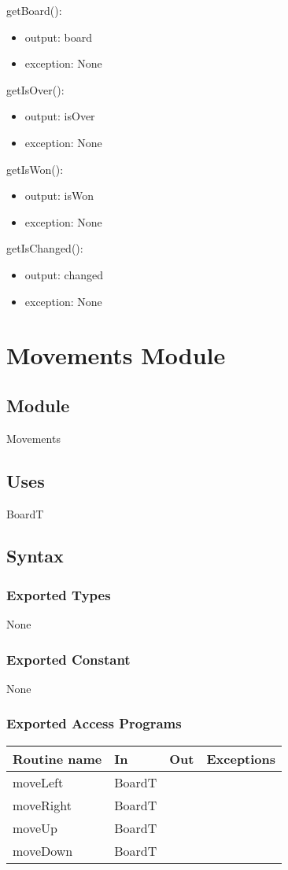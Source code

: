 \documentclass[12pt]{article}
\begin{document}
\noindent getBoard():
\begin{itemize}
    \item output: board
    \item exception: None
\end{itemize}

\noindent getIsOver():
\begin{itemize}
    \item output: isOver
    \item exception: None
\end{itemize}

\noindent getIsWon():
\begin{itemize}
    \item output: isWon
    \item exception: None
\end{itemize}

\noindent getIsChanged():
\begin{itemize}
    \item output: changed
    \item exception: None
\end{itemize}

\newpage

\section* {Movements Module}

\subsection*{Module}
Movements

\subsection* {Uses}
BoardT
\subsection* {Syntax}
\subsubsection* {Exported Types}
None
\subsubsection* {Exported Constant}
None
\subsubsection* {Exported Access Programs}
\begin{tabular}{| l | l | l | l |}
\hline
\textbf{Routine name} & \textbf{In} & \textbf{Out} & \textbf{Exceptions}\\
\hline
moveLeft & BoardT &  & \\
\hline
moveRight & BoardT &  & \\
\hline
moveUp & BoardT &  & \\
\hline
moveDown & BoardT &  & \\
\hline
\end{tabular}
\end{document}
